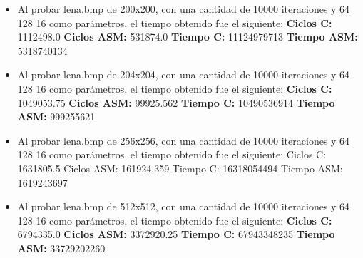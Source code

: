 \documentclass[10pt, a4paper]{article}
\begin{document}
\begin{itemize}
\begin{itemize}
\item{Al probar lena.bmp de 200x200, con una cantidad de 10000 iteraciones y 64 128 16 como parámetros, el tiempo obtenido fue el siguiente: \newline
\newline
\textbf{Ciclos C:}                  1112498.0\newline
\vspace{0.15cm}
\textbf{Ciclos ASM:}               531874.0\newline
\textbf{Tiempo C:}                 11124979713\newline
\textbf{Tiempo ASM:}               5318740134\newline}

\item{Al probar lena.bmp de 204x204, con una cantidad de 10000 iteraciones y 64 128 16 como parámetros, el tiempo obtenido fue el siguiente: \newline
\newline
\textbf{Ciclos C:}                 1049053.75\newline
\vspace{0.15cm}
\textbf{Ciclos ASM:}               99925.562\newline
\textbf{Tiempo C:}                 10490536914\newline
\textbf{Tiempo ASM:}               999255621\newline}

\item{Al probar lena.bmp de 256x256, con una cantidad de 10000 iteraciones y 64 128 16 como parámetros, el tiempo obtenido fue el siguiente: \newline
\newline
Ciclos C:                 1631805.5\newline
\vspace{0.15cm}
Ciclos ASM:               161924.359\newline
Tiempo C:                 16318054494\newline
Tiempo ASM:               1619243697\newline}

\item{Al probar lena.bmp de 512x512, con una cantidad de 10000 iteraciones y 64 128 16 como parámetros, el tiempo obtenido fue el siguiente: \newline
\newline
\textbf{Ciclos C:}                  6794335.0\newline
\vspace{0.15cm}
\textbf{Ciclos ASM:}               3372920.25\newline
\textbf{Tiempo C:}                 67943348235\newline
\textbf{Tiempo ASM:}               33729202260\newline}


\end{itemize}
\end{itemize}
\end{document}
